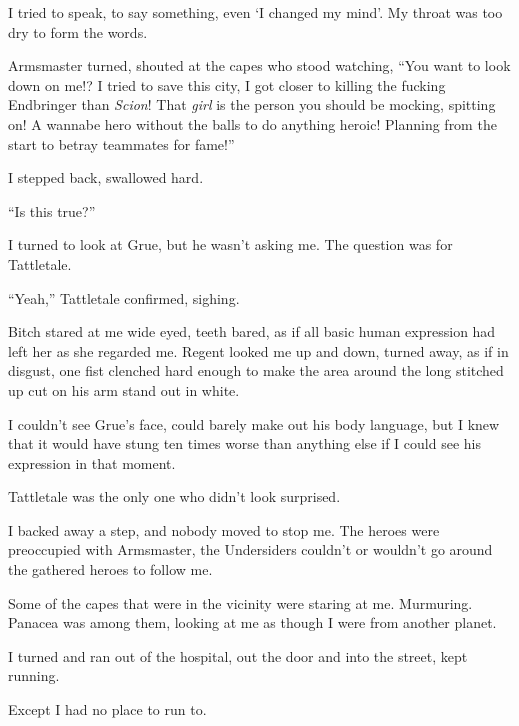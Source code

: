 I tried to speak, to say something, even `I changed my mind'.  My throat was too dry to form the words.



Armsmaster turned, shouted at the capes who stood watching, ``You want to look down on me!?  I tried to save this city, I got closer to killing the fucking Endbringer than \emph{Scion}!  That \emph{girl} is the person you should be mocking, spitting on!  A wannabe hero without the balls to do anything heroic!  Planning from the start to betray teammates for fame!''



I stepped back, swallowed hard.



``Is this true?''



I turned to look at Grue, but he wasn't asking me.  The question was for Tattletale.



``Yeah,'' Tattletale confirmed, sighing.



Bitch stared at me wide eyed, teeth bared, as if all basic human expression had left her as she regarded me.  Regent looked me up and down, turned away, as if in disgust, one fist clenched hard enough to make the area around the long stitched up cut on his arm stand out in white.



I couldn't see Grue's face, could barely make out his body language, but I knew that it would have stung ten times worse than anything else if I could see his expression in that moment.



Tattletale was the only one who didn't look surprised.



I backed away a step, and nobody moved to stop me.  The heroes were preoccupied with Armsmaster, the Undersiders couldn't or wouldn't go around the gathered heroes to follow me.



Some of the capes that were in the vicinity were staring at me.  Murmuring.  Panacea was among them, looking at me as though I were from another planet.



I turned and ran out of the hospital, out the door and into the street, kept running.



Except I had no place to run to.





